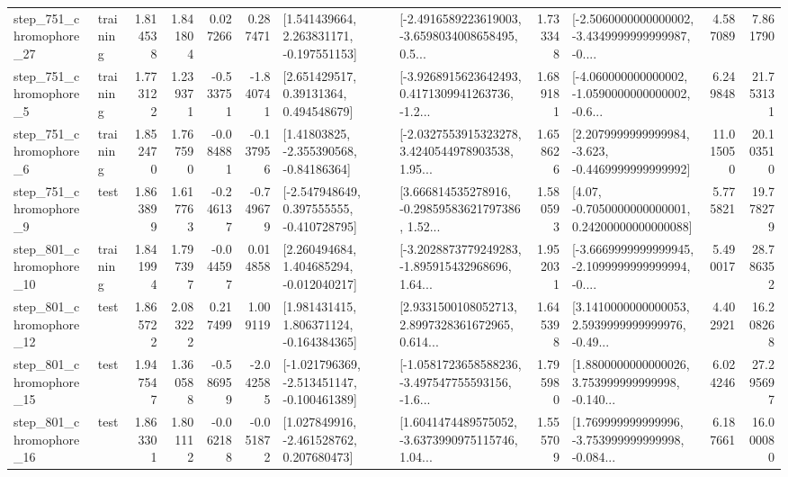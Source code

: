 \begin{tabular}{llrrrrllrlrr}
  step\_751\_chromophore\_27 &  training &      1.814538 &    1.841804 &      0.027266 &  0.287471 &    [1.541439664, 2.263831171, -0.197551153] &  [-2.4916589223619003, -3.6598034008658495, 0.5... &       1.733348 &  [-2.5060000000000002, -3.4349999999999987, -0.... &            4.587089 &          7.861790 \\
   step\_751\_chromophore\_5 &  training &      1.773122 &    1.239371 &     -0.533751 & -1.840741 &      [2.651429517, 0.39131364, 0.494548679] &  [-3.9268915623642493, 0.4171309941263736, -1.2... &       1.689181 &  [-4.060000000000002, -1.0590000000000002, -0.6... &            6.249848 &         21.753131 \\
   step\_751\_chromophore\_6 &  training &      1.852470 &    1.767590 &     -0.084881 & -0.137956 &     [1.41803825, -2.355390568, -0.84186364] &  [-2.0327553915323278, 3.4240544978903538, 1.95... &       1.658626 &  [2.2079999999999984, -3.623, -0.4469999999999992] &           11.015050 &         20.103510 \\
   step\_751\_chromophore\_9 &      test &      1.863899 &    1.617763 &     -0.246137 & -0.749679 &   [-2.547948649, 0.397555555, -0.410728795] &  [3.666814535278916, -0.29859583621797386, 1.52... &       1.580593 &   [4.07, -0.7050000000000001, 0.24200000000000088] &            5.775821 &         19.778279 \\
  step\_801\_chromophore\_10 &  training &      1.841994 &    1.797397 &     -0.044597 &  0.014858 &    [2.260494684, 1.404685294, -0.012040217] &  [-3.2028873779249283, -1.895915432968696, 1.64... &       1.952031 &  [-3.6669999999999945, -2.1099999999999994, -0.... &            5.490017 &         28.786352 \\
  step\_801\_chromophore\_12 &      test &      1.865722 &    2.083222 &      0.217499 &  1.009119 &    [1.981431415, 1.806371124, -0.164384365] &  [2.9331500108052713, 2.8997328361672965, 0.614... &       1.645398 &  [3.1410000000000053, 2.5939999999999976, -0.49... &            4.402921 &         16.208268 \\
  step\_801\_chromophore\_15 &      test &      1.947547 &    1.360588 &     -0.586959 & -2.042585 &  [-1.021796369, -2.513451147, -0.100461389] &  [-1.0581723658588236, -3.497547755593156, -1.6... &       1.795980 &  [1.8800000000000026, 3.753999999999998, -0.140... &            6.024246 &         27.295697 \\
  step\_801\_chromophore\_16 &      test &      1.863301 &    1.801112 &     -0.062188 & -0.051872 &    [1.027849916, -2.461528762, 0.207680473] &  [1.6041474489575052, -3.6373990975115746, 1.04... &       1.555709 &  [1.769999999999996, -3.753999999999998, -0.084... &            6.187661 &         16.000080 \\

\end{tabular}
